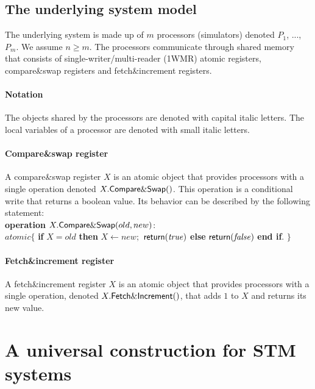 \subsection{The underlying system model}
The underlying system is made up of $m$ processors (simulators) 
denoted $P_1$, ..., $P_m$.  We assume $n \geq m$.
The processors communicate through  shared memory that consists  of 
single-writer/multi-reader (1WMR) atomic registers, 
compare\&swap registers and fetch\&increment registers. 

\paragraph{Notation} 
The  objects shared by the processors are denoted with capital italic letters.
The local  variables of a processor are denoted with small italic letters.

\paragraph{Compare\&swap register}
A compare\&swap register  $X$ is an atomic object that provides 
processors with  a single  operation
denoted  $X.{\sf Compare\&Swap}()$. This operation is a conditional 
write that returns a boolean value. Its behavior can be described by
 the following statement:
\\
{\bf operation}  $X.{\sf Compare\&Swap}(old,new)$:\\
\hspace*{1cm} $atomic\{$
{\bf if}  $X=old$ 
{\bf then} $X\leftarrow new;$  ${\sf return} (\mathit{true})$
{\bf else} ${\sf return} (\mathit{false})$ 
{\bf end if}. 
$\}$



\paragraph{Fetch\&increment register}
A fetch\&increment register  $X$ is an atomic object that provides 
processors with a  single  operation,
denoted  $X.{\sf Fetch\&Increment}()$, that  adds $1$ to $X$ and 
returns its new value. 


\section{A universal  construction for STM systems}
\label{sec:construction} 

